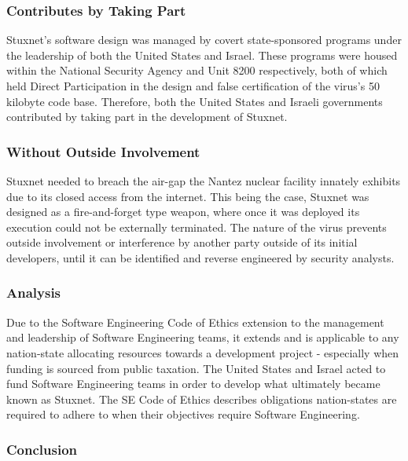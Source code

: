 \documentclass[12pt]{article}
\begin{document}
\begin{multicols}{2}
\subsubsection{Contributes by Taking Part}

Stuxnet's software design was managed by covert state-sponsored programs under the leadership of both the United States and Israel. These programs were housed within the National Security Agency and Unit 8200 respectively, both of which held Direct Participation in the design and false certification of the virus's 50 kilobyte code base.\cite{NationalSecurityAgencyAndUnit8200}\cite{w32.stuxnetDossier} Therefore, both the United States and Israeli governments contributed by taking part in the development of Stuxnet.

\subsubsection{Without Outside Involvement}

Stuxnet needed to breach the air-gap the Nantez nuclear facility innately exhibits due to its closed access from the internet. This being the case, Stuxnet was designed as a fire-and-forget type weapon, where once it was deployed its execution could not be externally terminated. The nature of the virus prevents outside involvement or interference by another party outside of its initial developers, until it can be identified and reverse engineered by security analysts.\cite{stuxnetFireandForget}


\subsubsection{Analysis}
Due to the Software Engineering Code of Ethics extension to the management and leadership of Software Engineering teams, it extends and is applicable to any nation-state allocating resources towards a development project - especially when funding is sourced from public taxation. The United States and Israel acted to fund Software Engineering teams in order to develop what ultimately became known as Stuxnet. The SE Code of Ethics describes obligations nation-states are required to adhere to when their objectives require Software Engineering.

\subsubsection{Conclusion}


\end{multicols}
\end{document}

